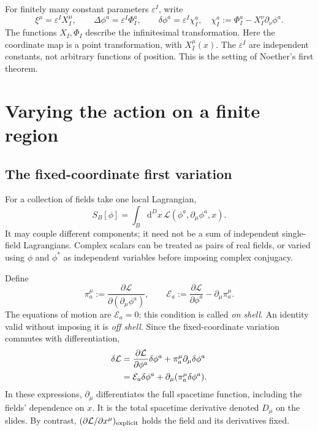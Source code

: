 \documentclass[11pt]{article}
\newcommand{\dd}{\mathrm{d}}
\newcommand{\Lag}{\mathcal{L}}
\newcommand{\Eul}{\mathcal E}
\begin{document}
For finitely many constant parameters \(\varepsilon^I\), write
\begin{equation}
\xi^\mu=\varepsilon^I X_I^\mu,
\qquad \Delta\phi^a=\varepsilon^I\Phi_I^a,
\qquad \delta\phi^a=\varepsilon^I\chi_I^a,
\quad \chi_I^a:=\Phi_I^a-X_I^\nu\partial_\nu\phi^a.
\label{eq:generators}
\end{equation}
The functions \(X_I,\Phi_I\) describe the infinitesimal transformation.
Here the coordinate map is a point transformation, with \(X_I^\mu(x)\).
The \(\varepsilon^I\) are independent constants, not arbitrary functions
of position. This is the setting of Noether's first theorem.

\section{Varying the action on a finite region}
\label{sec:variation}

\subsection{The fixed-coordinate first variation}
For a collection of fields take one local Lagrangian,
\begin{equation}
S_B[\phi]=\int_B\dd^D x\,\Lag(\phi^a,\partial_\mu\phi^a,x).
\end{equation}
It may couple different components; it need not be a sum of independent
single-field Lagrangians. Complex scalars can be treated as pairs of real
fields, or varied using \(\phi\) and \(\phi^*\) as independent variables
before imposing complex conjugacy.

Define
\begin{equation}
\pi_a^\mu:=\frac{\partial\Lag}{\partial(\partial_\mu\phi^a)},
\qquad
\Eul_a:=\frac{\partial\Lag}{\partial\phi^a}-\partial_\mu\pi_a^\mu.
\label{eq:ELdefinitions}
\end{equation}
The equations of motion are \(\Eul_a=0\); this condition is called
\emph{on shell}. An identity valid without imposing it is \emph{off shell}.
Since the fixed-coordinate variation commutes with differentiation,
\begin{align}
\delta\Lag
&=\frac{\partial\Lag}{\partial\phi^a}\delta\phi^a
 +\pi_a^\mu\partial_\mu\delta\phi^a\notag\\
&=\Eul_a\delta\phi^a+\partial_\mu(\pi_a^\mu\delta\phi^a).
\label{eq:basicVariation}
\end{align}
In these expressions, \(\partial_\mu\) differentiates the full spacetime
function, including the fields' dependence on \(x\). It is the total
spacetime derivative denoted \(D_\mu\) on the slides. By contrast,
\((\partial\Lag/\partial x^\mu)_{\rm explicit}\) holds the field and
its derivatives fixed.
\end{document}
